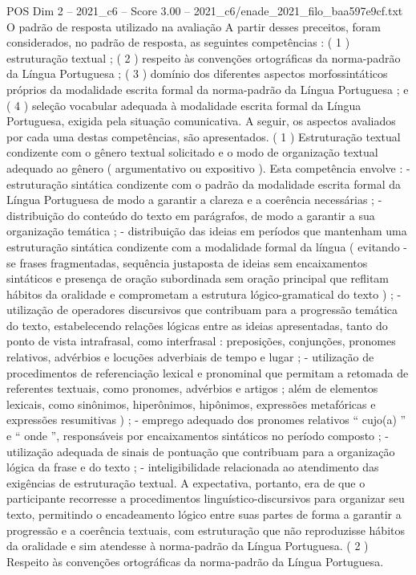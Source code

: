 \begin{textsample}{POS Dim 2 – 2021\_c6 – Score 3.00 – 2021\_c6/enade\_2021\_filo\_baa597e9cf.txt}
O padrão de resposta utilizado na avaliação A partir desses preceitos, foram considerados, no padrão de resposta, as seguintes competências : ( 1 ) estruturação textual ; ( 2 ) respeito às convenções ortográficas da norma-padrão da Língua Portuguesa ; ( 3 ) domínio dos diferentes aspectos morfossintáticos próprios da modalidade escrita formal da norma-padrão da Língua Portuguesa ; e ( 4 ) seleção vocabular adequada à modalidade escrita formal da Língua Portuguesa, exigida pela situação comunicativa.
A seguir, os aspectos avaliados por cada uma destas competências, são apresentados. ( 1 ) Estruturação textual condizente com o gênero textual solicitado e o modo de organização textual adequado ao gênero ( argumentativo ou expositivo ).
Esta competência envolve : - estruturação sintática condizente com o padrão da modalidade escrita formal da Língua Portuguesa de modo a garantir a clareza e a coerência necessárias ; - distribuição do conteúdo do texto em parágrafos, de modo a garantir a sua organização temática ; - distribuição das ideias em períodos que mantenham uma estruturação sintática condizente com a modalidade formal da língua ( evitando -se frases fragmentadas, sequência justaposta de ideias sem encaixamentos sintáticos e presença de oração subordinada sem oração principal que reflitam hábitos da oralidade e comprometam a estrutura lógico-gramatical do texto ) ; - utilização de operadores discursivos que contribuam para a progressão temática do texto, estabelecendo relações lógicas entre as ideias apresentadas, tanto do ponto de vista intrafrasal, como interfrasal : preposições, conjunções, pronomes relativos, advérbios e locuções adverbiais de tempo e lugar ; - utilização de procedimentos de referenciação lexical e pronominal que permitam a retomada de referentes textuais, como pronomes, advérbios e artigos ; além de elementos lexicais, como sinônimos, hiperônimos, hipônimos, expressões metafóricas e expressões resumitivas ) ; - emprego adequado dos pronomes relativos “ cujo(a) ” e “ onde ”, responsáveis por encaixamentos sintáticos no período composto ; - utilização adequada de sinais de pontuação que contribuam para a organização lógica da frase e do texto ; - inteligibilidade relacionada ao atendimento das exigências de estruturação textual.
A expectativa, portanto, era de que o participante recorresse a procedimentos linguístico-discursivos para organizar seu texto, permitindo o encadeamento lógico entre suas partes de forma a garantir a progressão e a coerência textuais, com estruturação que não reproduzisse hábitos da oralidade e sim atendesse à norma-padrão da Língua Portuguesa. ( 2 ) Respeito às convenções ortográficas da norma-padrão da Língua Portuguesa.

\end{textsample}
